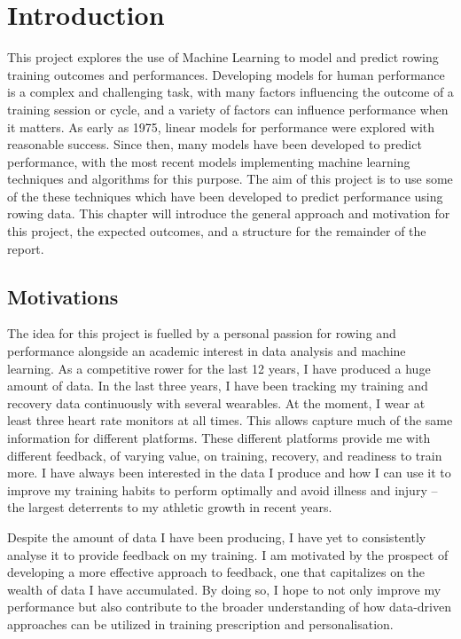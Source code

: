 \chapter{\label{ch:intro}Introduction}
This project explores the use of Machine Learning to model and predict rowing training outcomes and performances. Developing models for human performance is a complex and challenging task, with many factors influencing the outcome of a training session or cycle, and a variety of factors can influence performance when it matters. As early as 1975, linear models for performance were explored with reasonable success. Since then, many models have been developed to predict performance, with the most recent models implementing machine learning techniques and algorithms for this purpose. The aim of this project is to use some of the these techniques which have been developed to predict performance using rowing data. This chapter will introduce the general approach and motivation for this project, the expected outcomes, and a structure for the remainder of the report.

\section{Motivations}
The idea for this project is fuelled by a personal passion for rowing and performance alongside an academic interest in data analysis and machine learning. As a competitive rower for the last 12 years, I have produced a huge amount of data. In the last three years, I have been tracking my training and recovery data continuously with several wearables. At the moment, I wear at least three heart rate monitors at all times. This allows capture much of the same information for different platforms. These different platforms provide me with different feedback, of varying value, on training, recovery, and readiness to train more. I have always been interested in the data I produce and how I can use it to improve my training habits to perform optimally and avoid illness and injury -- the largest deterrents to my athletic growth in recent years. 

Despite the amount of data I have been producing, I have yet to consistently analyse it to provide feedback on my training. I am motivated by the prospect of developing a more effective approach to feedback, one that capitalizes on the wealth of data I have accumulated. By doing so, I hope to not only improve my performance but also contribute to the broader understanding of how data-driven approaches can be utilized in training prescription and personalisation.

